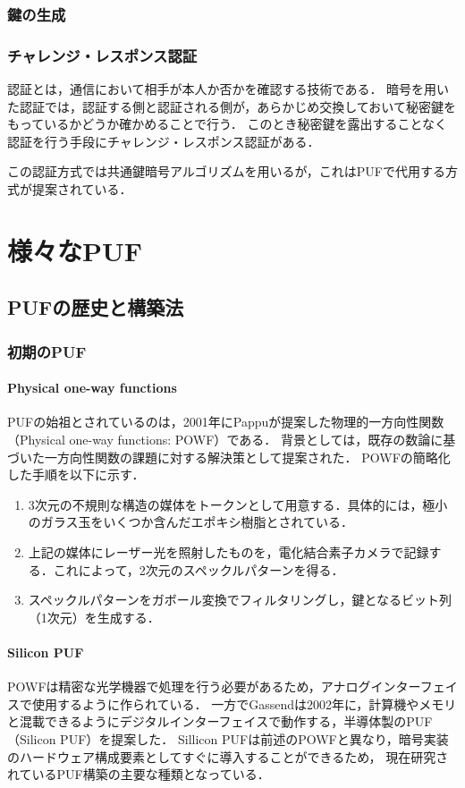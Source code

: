 \documentclass[technicalreport]{ieicej} %
\begin{document}
\subsubsection{鍵の生成}
\subsubsection{チャレンジ・レスポンス認証}
認証とは，通信において相手が本人か否かを確認する技術である．
暗号を用いた認証では，認証する側と認証される側が，あらかじめ交換しておいて秘密鍵をもっているかどうか確かめることで行う．
このとき秘密鍵を露出することなく認証を行う手段にチャレンジ・レスポンス認証がある．

この認証方式では共通鍵暗号アルゴリズムを用いるが，これはPUFで代用する方式が提案されている．

\section{様々なPUF}
\subsection{PUFの歴史と構築法}
\subsubsection{初期のPUF}
\label{firstpuf}
\paragraph{Physical one-way functions}
PUFの始祖とされているのは，2001年にPappuが提案した物理的一方向性関数（Physical one-way functions: POWF）\cite{pappu}である．
背景としては，既存の数論に基づいた一方向性関数の課題に対する解決策として提案された．
POWFの簡略化した手順を以下に示す．
\begin{enumerate}
  \item 3次元の不規則な構造の媒体をトークンとして用意する．具体的には，極小のガラス玉をいくつか含んだエポキシ樹脂とされている．
  \item 上記の媒体にレーザー光を照射したものを，電化結合素子カメラで記録する．これによって，2次元のスペックルパターンを得る．
  \item スペックルパターンをガボール変換でフィルタリングし，鍵となるビット列（1次元）を生成する．
\end{enumerate}

\paragraph{Silicon PUF}
\label{SiliconPUF}
POWFは精密な光学機器で処理を行う必要があるため，アナログインターフェイスで使用するように作られている．
一方でGassendは2002年に，計算機やメモリと混載できるようにデジタルインターフェイスで動作する，半導体製のPUF（Silicon PUF）を提案した\cite{gassend1}．
Sillicon PUFは前述のPOWFと異なり，暗号実装のハードウェア構成要素としてすぐに導入することができるため，
現在研究されているPUF構築の主要な種類となっている．
\end{document}
